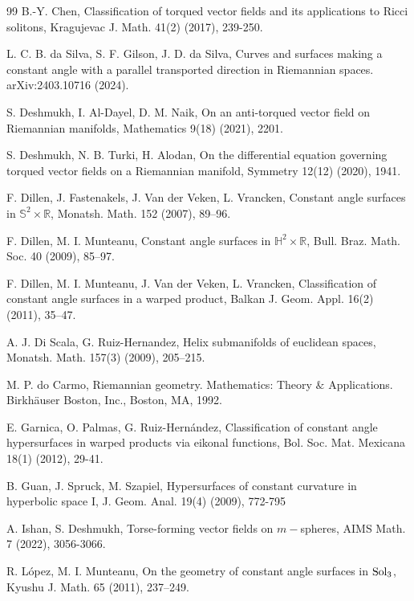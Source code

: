 \documentclass[12pt,reqno]{amsart}
\def\r{\mathbb R}
\def\s{\mathbb S}
\def\h{\mathbb H}
\theoremstyle{definition}
\begin{document}
\begin{thebibliography}{99}
 B.-Y. Chen, Classification of torqued vector fields and its applications to Ricci solitons, Kragujevac J. Math. 41(2) (2017), 239-250.

 L. C. B. da Silva, S. F. Gilson, J. D. da Silva, Curves and surfaces making a constant angle with a parallel transported direction in Riemannian spaces. arXiv:2403.10716 (2024).

 S. Deshmukh, I. Al-Dayel, D. M. Naik, On an anti-torqued vector field on Riemannian manifolds, Mathematics 9(18) (2021), 2201.

 S. Deshmukh, N. B. Turki, H. Alodan, On the differential equation governing torqued vector fields on a Riemannian manifold, Symmetry 12(12) (2020), 1941.

 F. Dillen, J. Fastenakels, J. Van der Veken, L. Vrancken, Constant angle surfaces in $\s^2\times \r$, Monatsh. Math. 152 (2007), 89–96.

 F. Dillen, M. I. Munteanu, Constant angle surfaces in $\h^2\times \r$, Bull. Braz. Math. Soc. 40 (2009), 85–97.

 F. Dillen, M. I. Munteanu, J. Van der Veken, L. Vrancken, Classification of constant angle surfaces in a warped product, Balkan J. Geom. Appl. 16(2) (2011), 35–47.

 A. J. Di Scala, G. Ruiz-Hernandez, Helix submanifolds of euclidean spaces, Monatsh. Math. 157(3) (2009), 205–215.

 M. P. do Carmo, Riemannian geometry.  Mathematics: Theory $\&$ Applications. Birkhäuser Boston, Inc., Boston, MA, 1992. 

 E. Garnica, O. Palmas, G. Ruiz-Hernández, Classification of constant angle hypersurfaces in warped products via eikonal functions, Bol. Soc. Mat. Mexicana 18(1) (2012), 29-41.

 B. Guan, J. Spruck, M. Szapiel, Hypersurfaces of constant curvature in hyperbolic space I, J. Geom. Anal. 19(4) (2009), 772-795

  A. Ishan, S. Deshmukh, Torse-forming vector fields on $m-$spheres, AIMS Math. 7 (2022), 3056-3066.

 R. L\'opez, M. I. Munteanu, On the geometry of constant angle surfaces in $\textnormal{Sol}_3$, Kyushu J. Math. 65 (2011), 237–249.



\end{thebibliography}
\end{document}
